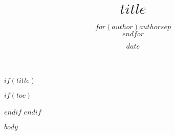 \documentclass[12pt]{article}
\title{$title$}
\author{$for(author)$$author$$sep$\\$endfor$}
\date{$date$}
\begin{document}
$if(title)$
\maketitle
$if(toc)$
\listoffigures
\tableofcontents
\newpage
$endif$
$endif$

$body$
\end{document}
